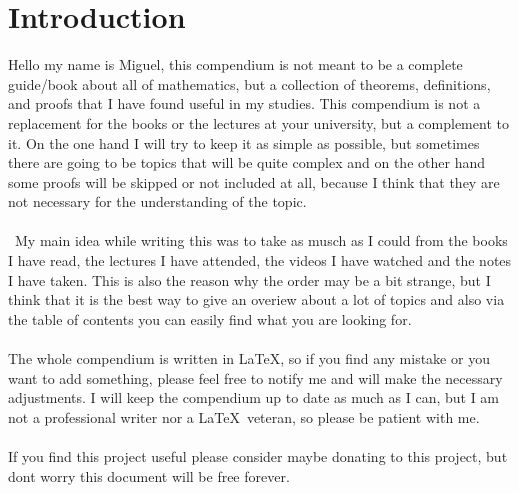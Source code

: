 \section{Introduction}

Hello my name is Miguel, this compendium is not meant to be a complete 
guide/book about all of mathematics,
but a collection of theorems, definitions, and proofs that I have found useful in my studies.
This compendium is not a replacement for the books or the lectures at your university, but a complement to it.
On the one hand I will try to keep it as simple as possible, but sometimes there are going to be topics 
that will be quite 
complex and on the other hand some proofs will be 
skipped or not included at all, because I think that they 
are not necessary for the understanding of the topic.
\\\\\
My main idea while writing this was to take as musch as I could from the books I have read, the lectures 
I have attended, the videos I have watched 
and the notes I have taken. This is also the reason why the order may be a bit strange, 
but I think that it is the best way to give an overiew about a lot of topics and also 
via the table of contents you can
easily find what you are looking for.
\\\\
The whole compendium is written in \LaTeX, so if you find any mistake or you want to add something, please 
feel free to notify me and will make the necessary adjustments.
I will keep the compendium up to date as much as 
I can, but I am not a professional writer nor a \LaTeX\ veteran, so please be patient with me.
\\\\
If you find this project useful please consider maybe donating
to this project, but dont worry this document will be free forever.

\newpage
